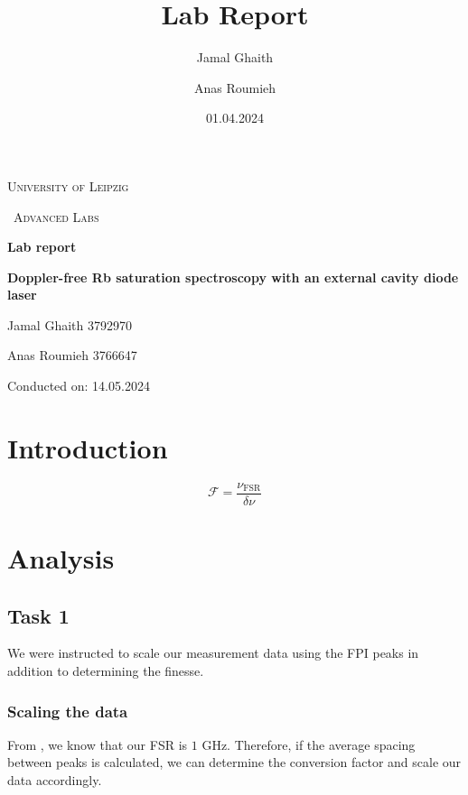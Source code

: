 \documentclass{article}
\title{Lab Report}
\author{Jamal Ghaith}
\author{Anas Roumieh}
\date{01.04.2024}
\begin{document}
\begin{titlepage}
	\centering
	{\scshape\LARGE University of Leipzig \par}
	\vspace{1cm}
	{\scshape\ Advanced Labs\par}
	\vspace{1.5cm}
	{\huge\bfseries Lab report\par}
	\vspace{2cm}
	{\huge\bfseries Doppler-free Rb saturation spectroscopy with an external cavity diode laser\par}
	\vspace{2cm}
	{\Large Jamal Ghaith 3792970\par}
    {\Large Anas Roumieh 3766647\par}
	\vfill

    {\Large Conducted on:  14.05.2024\par}
	\vfill
\end{titlepage}


\tableofcontents
{}
\pagebreak{}

\section{Introduction}

\begin{equation}
	\mathscr{F} = \frac{\nu_{\text{FSR}}}{\delta \nu}
	\label{eq:finesse}
\end{equation}

\section{Analysis}

\subsection{Task 1}

We were instructed to scale our measurement data using the FPI peaks in addition to determining the finesse.

\subsubsection{Scaling the data}

From \cite{jung_2018_dopplerfree}, we know that our FSR is $1$ GHz. Therefore, if the average spacing between peaks is calculated, we can determine the conversion factor and scale our data accordingly.
\end{document}
